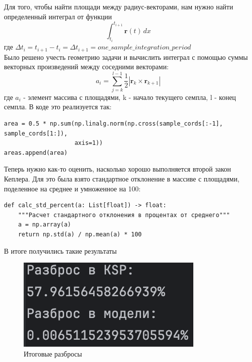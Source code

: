 \documentclass{article}
\begin{document}
    Для того, чтобы найти площади между радиус-векторами, нам нужно найти определенный интеграл от функции \[ \int_{t_i}^{t_{i+1}} \mathbf{r}(t) \,dx \] где $\Delta{t}_i=t_{i+1}-t_{i}=\Delta{t}_{i+1}=one\_sample\_integration\_period$ \\
    Было решено учесть геометрию задачи и вычислить интеграл с помощью суммы векторных произведений между соседними векторами: 
    \[a_i = \sum_{j=k}^{l-1} \frac{1}{2}|\mathbf{r}_{k} \times \mathbf{r}_{k + 1}| \] где $a_i$ - элемент массива с площадями, k - начало текущего семпла, l - конец семпла.
    В коде это реализуется так:
    \begin{verbatim}
area = 0.5 * np.sum(np.linalg.norm(np.cross(sample_cords[:-1], sample_cords[1:]),
                    axis=1))
areas.append(area)
    \end{verbatim}
    Теперь нужно как-то оценить, насколько хорошо выполняется второй закон Кеплера. Для это была взято стандартное отклонение в массиве с площадями, поделенное на среднее и умноженное на 100:
    \begin{verbatim}
def calc_std_percent(a: List[float]) -> float:
    """Расчет стандартного отклонения в процентах от среднего"""
    a = np.array(a)
    return np.std(a) / np.mean(a) * 100
    \end{verbatim}
    В итоге получились такие результаты
    \begin{figure}[H]
        \centering
        \includegraphics[width=0.5\linewidth]{images/result.png}
        \caption{Итоговые разбросы}
        \label{fig:reslut}
    \end{figure}
\end{document}

